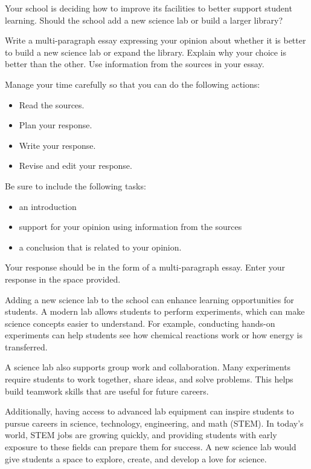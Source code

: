 \documentclass[12pt]{article}
\begin{document}
\begin{tcolorbox}[colframe=black!60, colback=white, 
coltitle=black, colbacktitle=black!15, fonttitle=\bfseries\Large, 
title=Example Test Prompt, halign title=center, left=10pt, right=10pt, top=10pt, bottom=15pt]
Your school is deciding how to improve its facilities to better support student learning. Should the school add a new science lab or build a larger library?

Write a multi-paragraph essay expressing your opinion about whether it is better to build a new science lab or expand the library. Explain why your choice is better than the other. Use information from the sources in your essay.

Manage your time carefully so that you can do the following actions:
\begin{itemize}
    \item Read the sources.
    \item Plan your response.
    \item Write your response.
    \item Revise and edit your response.
\end{itemize}
Be sure to include the following tasks:
\begin{itemize}
    \item an introduction
    \item support for your opinion using information from the sources
    \item a conclusion that is related to your opinion.
\end{itemize}
Your response should be in the form of a multi-paragraph essay. Enter your response in the space provided.
\end{tcolorbox}

\vspace{1em}

\begin{tcolorbox}[colframe=black!60, colback=white, 
coltitle=black, colbacktitle=black!15, fonttitle=\bfseries\Large, 
title=Source 1: Building a Science Lab, halign title=center, left=10pt, right=10pt, top=10pt, bottom=15pt]
Adding a new science lab to the school can enhance learning opportunities for students. A modern lab allows students to perform experiments, which can make science concepts easier to understand. For example, conducting hands-on experiments can help students see how chemical reactions work or how energy is transferred.

A science lab also supports group work and collaboration. Many experiments require students to work together, share ideas, and solve problems. This helps build teamwork skills that are useful for future careers.

Additionally, having access to advanced lab equipment can inspire students to pursue careers in science, technology, engineering, and math (STEM). In today’s world, STEM jobs are growing quickly, and providing students with early exposure to these fields can prepare them for success. A new science lab would give students a space to explore, create, and develop a love for science.
\end{tcolorbox}
\end{document}
